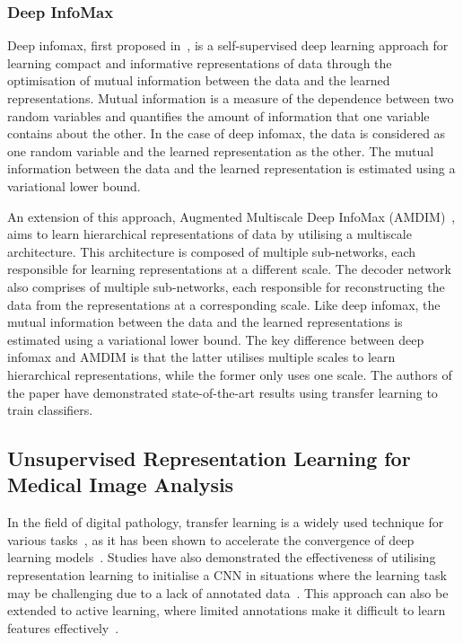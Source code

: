 \subsubsection{Deep InfoMax}
\label{subsubsec:DIM}
Deep infomax, first proposed in~\citep{hjelm2018learning}, is a self-supervised deep learning approach for learning compact and informative representations of data through the optimisation of mutual information between the data and the learned representations. Mutual information is a measure of the dependence between two random variables and quantifies the amount of information that one variable contains about the other. In the case of deep infomax, the data is considered as one random variable and the learned representation as the other. The mutual information between the data and the learned representation is estimated using a variational lower bound.

An extension of this approach, Augmented Multiscale Deep InfoMax (AMDIM)~\citep{bachman2019learning}, aims to learn hierarchical representations of data by utilising a multiscale architecture. This architecture is composed of multiple sub-networks, each responsible for learning representations at a different scale. The decoder network also comprises of multiple sub-networks, each responsible for reconstructing the data from the representations at a corresponding scale. Like deep infomax, the mutual information between the data and the learned representations is estimated using a variational lower bound. The key difference between deep infomax and AMDIM is that the latter utilises multiple scales to learn hierarchical representations, while the former only uses one scale. The authors of the paper have demonstrated state-of-the-art results using transfer learning to train classifiers.

\subsection{Unsupervised Representation Learning for \\Medical Image Analysis}
\label{subsec:unsupervise_representation_for_medical}
In the field of digital pathology, transfer learning is a widely used technique for various tasks~\citep{srinidhi2021deep}, as it has been shown to accelerate the convergence of deep learning models~\citep{bayramoglu2016transfer}. Studies have also demonstrated the effectiveness of utilising representation learning to initialise a CNN in situations where the learning task may be challenging due to a lack of annotated data~\citep{hou2016automatic}. This approach can also be extended to active learning, where limited annotations make it difficult to learn features effectively~\citep{carse2019active}.

